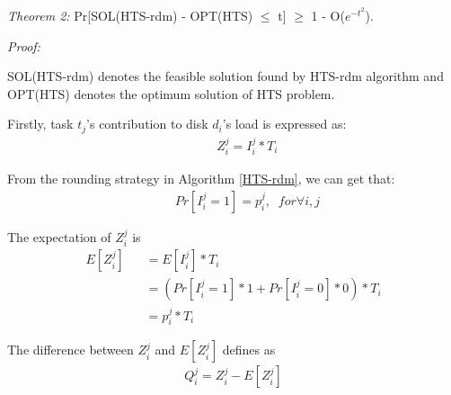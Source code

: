 \documentclass[conference]{IEEEtran}
\begin{document}
\emph{Theorem 2:} Pr[SOL(HTS-rdm) - OPT(HTS) $\leq$ t] $\geq$ 1 - O($e^{-t^2}$).

\emph{Proof:}

SOL(HTS-rdm) denotes the feasible solution found by HTS-rdm algorithm and  OPT(HTS) denotes the optimum solution of HTS problem.

Firstly, task $t_j$'s contribution to disk $d_i$'s load is expressed as:
 \begin{align}
&\;\;\;\;\;Z_i^j = I_i^j*T_i
\end{align}

From the rounding strategy in Algorithm \ref{HTS-rdm}, we can get that:
 \begin{align}
&\;\;\;\;\;Pr[I_i^j = 1] = p_i^j,\;\;for\forall i,j \nonumber
\end{align}

The expectation of $Z_i^j$ is
\begin{align}
E[Z_i^j] &\;\;\;= E[I_i^j]*T_i \nonumber\\
&\;\;\;= (Pr[I_i^j = 1] * 1 + Pr[I_i^j = 0] * 0)*T_i \nonumber\\
&\;\;\;= p_i^j*T_i\label{prove:expect}
\end{align}

The difference between $Z_i^j$ and $E[Z_i^j]$ defines as
\begin{align}
Q_i^j = Z_i^j - E[Z_i^j]\label{prove:diff}
\end{align}
\end{document}
